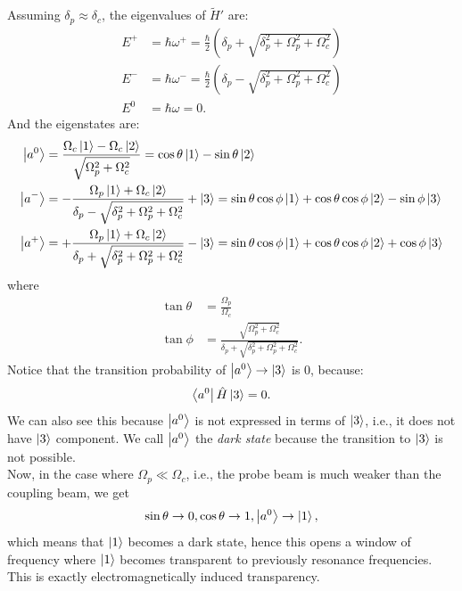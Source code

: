 \documentclass{article}
\theoremstyle{definition}
\begin{document}
Assuming $\delta_p \approx \delta_c$, the eigenvalues of $\tilde{H}'$ are:
\begin{align}
E^+ &= \hbar\omega^+ = \frac{\hbar}{2}\left( \delta_p + \sqrt{\delta^2_p + \Omega^2_p + \Omega^2_c}\right) \nonumber\\
E^- &= \hbar\omega^- = \frac{\hbar}{2}\left( \delta_p - \sqrt{\delta^2_p + \Omega^2_p + \Omega^2_c}\right) \nonumber\\
E^0 &= \hbar\omega = 0.
\end{align}
And the eigenstates are:
\begin{align}
\ket{a^0} &= \frac{\Omega_c\ket{1} - \Omega_c\ket{2}}{\sqrt{\Omega^2_p + \Omega^2_c}} = \cos\theta\ket{1} - \sin\theta\ket{2}\nonumber\\
\ket{a^-} &= -\frac{\Omega_p\ket{1} + \Omega_c\ket{2}}{\delta_p - \sqrt{\delta^2_p + \Omega^2_p + \Omega^2_c}} +\ket{3} = \sin\theta\cos\phi\ket{1} + \cos\theta \cos \phi \ket{2} - \sin\phi\ket{3}\nonumber\\
\ket{a^+} &= +\frac{\Omega_p\ket{1} + \Omega_c\ket{2}}{\delta_p + \sqrt{\delta^2_p + \Omega^2_p + \Omega^2_c}} -\ket{3} = \sin\theta\cos\phi\ket{1} + \cos\theta \cos \phi \ket{2} + \cos\phi\ket{3}
\end{align}
where 
\begin{align}
\tan\theta &= \frac{\Omega_p}{\Omega_c}\\
\tan\phi &= \frac{\sqrt{\Omega^2_p+\Omega^2_c}}{\delta_p +  \sqrt{\delta^2_p + \Omega^2_p + \Omega^2_c}}.
\end{align}
Notice that the transition probability of $\ket{a^0} \rightarrow \ket{3}$ is 0, because:
\begin{align}
\bra{a^0}\hat{H}\ket{3} = 0.
\end{align}
We can also see this because $\ket{a^0}$ is not expressed in terms of $\ket{3}$, i.e., it does not have $\ket{3}$ component. We call $\ket{a^0}$ the \textit{dark state} because the transition to $\ket{3}$ is not possible.\\

Now, in the case where $\Omega_p \ll \Omega_c$, i.e., the probe beam is much weaker than the coupling beam, we get
\begin{align}
\sin\theta \rightarrow 0, \cos\theta \rightarrow 1, \ket{a^0} \rightarrow \ket{1},
\end{align}
which means that $\ket{1}$ becomes a dark state, hence this opens a window of frequency where $\ket{1}$ becomes transparent to previously resonance frequencies. This is exactly electromagnetically induced transparency.
\end{document}
